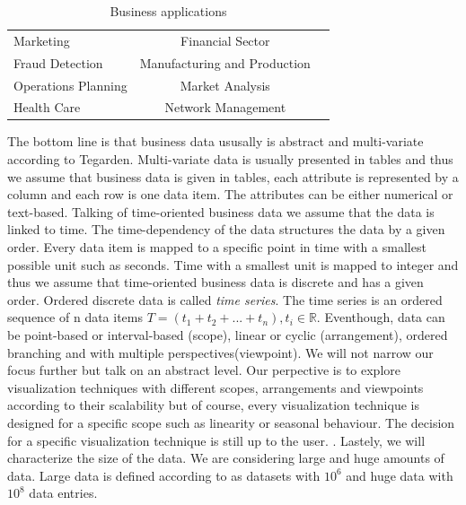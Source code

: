 \begin{table}[th]
	\centering
	\caption[Table 1]{Business applications\cite{Brachman1996,Tegarden1999}}
	\label{businessapplications}
	\begin{tabu}{lcc}
	\toprule
	Marketing & Financial Sector \\
	Fraud Detection & Manufacturing and Production \\
	Operations Planning & Market Analysis \\
	Health Care & Network Management\\
	\bottomrule
	\end{tabu}
\end{table}

The bottom line is that business data ususally is abstract and multi-variate according to Tegarden\cite{tegarden1999}. Multi-variate data is usually presented in tables\cite{Borgo2013} and thus we assume that business data is given in tables, each attribute is represented by a column and each row is one data item. The attributes can be either numerical or text-based. 
Talking of time-oriented business data we assume that the data is linked to time. The time-dependency of the data structures the data by a given order. Every data item is mapped to a specific point in time with a smallest possible unit such as seconds. Time with a smallest unit is mapped to integer\cite{Aigner2011} and thus we assume that time-oriented business data is discrete and has a given order. Ordered discrete data is called \textit{time series}. The time series is an ordered sequence of n data items $T=(t_1+t_2+...+t_n),t_i\in\mathbb{R}$. Eventhough, data can be point-based or interval-based (scope), linear or cyclic (arrangement), ordered branching and with multiple perspectives(viewpoint)\cite{Aigner2011}. We will not narrow our focus further but talk on an abstract level. Our perpective is to explore visualization techniques with different scopes, arrangements and viewpoints according to their scalability but of course, every visualization technique is designed for a specific scope such as linearity or seasonal behaviour. The decision for a specific visualization technique is still up to the user. .
Lastely, we will characterize the size of the data. We are considering large and huge amounts of data. Large data is defined according to\cite{Huber1994} as datasets with $10^6$ and huge data with $10^8$ data entries.


